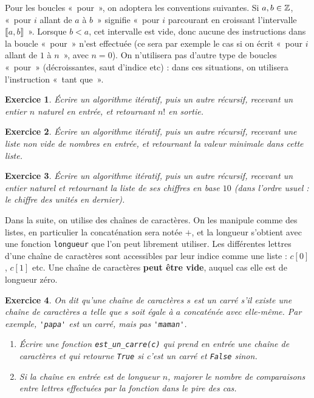 \documentclass[11pt,a4paper]{article}
\newtheorem{ex}{Exercice}
\begin{document}
\bigskip

Pour les boucles «~pour~», on adoptera les conventions suivantes. Si $a,b\in \mathbb{Z}$, «~pour $i$ allant de $a$ à $b$~» signifie «~pour $i$ parcourant en croissant l'intervalle $\llbracket a,b\rrbracket$~». Lorsque $b<a$, cet intervalle est vide, donc aucune des instructions dans la boucle «~pour~» n'est effectuée (ce sera par exemple le cas si on écrit «~pour $i$ allant de $1$ à $n$~», avec $n=0$). On n'utilisera pas d'autre type de boucles «~pour~» (décroissantes, saut d'indice etc) : dans ces situations, on utilisera l'instruction «~tant que~».






\begin{ex}
Écrire un algorithme itératif, puis un autre récursif, recevant un entier $n$ naturel en entrée, et retournant $n!$ en sortie.
\end{ex}

\begin{ex}
Écrire un algorithme itératif, puis un autre récursif, recevant une liste non vide de nombres en entrée, et retournant la valeur minimale dans cette liste.
\end{ex}


\begin{ex}\label{base10}
Écrire un algorithme itératif, puis un autre récursif, recevant un entier naturel et retournant la liste de ses chiffres en base $10$ (dans l'ordre usuel : le chiffre des unités en dernier).
\end{ex}

Dans la suite, on utilise des chaînes de caractères. On les manipule comme des listes, en particulier la concaténation sera notée \og $+$\fg, et la longueur s'obtient avec une fonction  \verb+longueur+ que l'on peut librement utiliser. Les différentes lettres d'une chaîne de caractères sont accessibles par leur indice comme une liste : $c[0]$, $c[1]$ etc.
Une chaîne de caractères \textbf{peut être vide}, auquel cas elle est de longueur zéro.

\begin{ex}\label{est_un_carre}
On dit qu'une chaîne de caractères $s$ est un carré s'il existe une chaîne de caractères $a$ telle que $s$ soit égale à $a$ concaténée avec elle-même. Par exemple, \verb+'papa'+ est un carré, mais pas \verb+'maman'+. 
\begin{enumerate}
\item Écrire une fonction \verb+est_un_carre(c)+ qui prend en entrée une chaîne de caractères et qui retourne \verb+True+ si c'est un carré et \verb+False+ sinon.
\item Si la chaîne en entrée est de longueur $n$, majorer le nombre de comparaisons entre lettres effectuées par la fonction dans le pire des cas.
\end{enumerate}
\end{ex}
\end{document}
